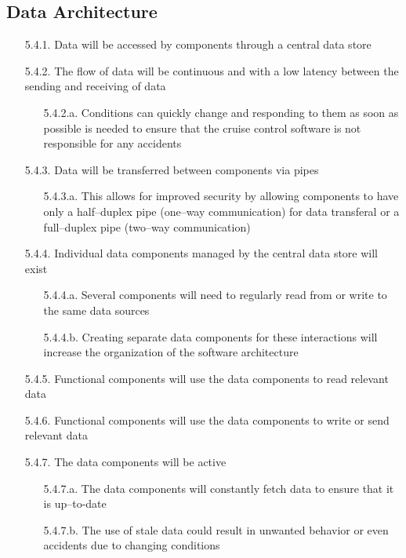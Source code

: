 \documentclass{article}
\begin{document}
	\subsection{Data Architecture}
	\begin{enumerate}
		\item[5.4.1.] Data will be accessed by components through a central data store
		\item[5.4.2.] The flow of data will be continuous and with a low latency between the sending and receiving of data
		\begin{enumerate}
			\item[5.4.2.a.] Conditions can quickly change and responding to them as soon as possible is needed to ensure that the cruise control software is not responsible for any accidents
		\end{enumerate}
		\item[5.4.3.] Data will be transferred between components via pipes
		\begin{enumerate}
			\item[5.4.3.a.] This allows for improved security by allowing components to have only a half--duplex pipe (one--way communication) for data transferal or a full--duplex pipe (two--way communication)
		\end{enumerate}
		\item[5.4.4.] Individual data components managed by the central data store will exist
		\begin{enumerate}
			\item[5.4.4.a.] Several components will need to regularly read from or write to the same data sources
			\item[5.4.4.b.] Creating separate data components for these interactions will increase the organization of the software architecture
		\end{enumerate}
		\item[5.4.5.] Functional components will use the data components to read relevant data
		\item[5.4.6.] Functional components will use the data components to write or send relevant data
		\item[5.4.7.] The data components will be active
		\begin{enumerate}
			\item[5.4.7.a.] The data components will constantly fetch data to ensure that it is up--to-date
			\item[5.4.7.b.] The use of stale data could result in unwanted behavior or even accidents due to changing conditions
		\end{enumerate}
	\end{enumerate}
	
\end{document}
